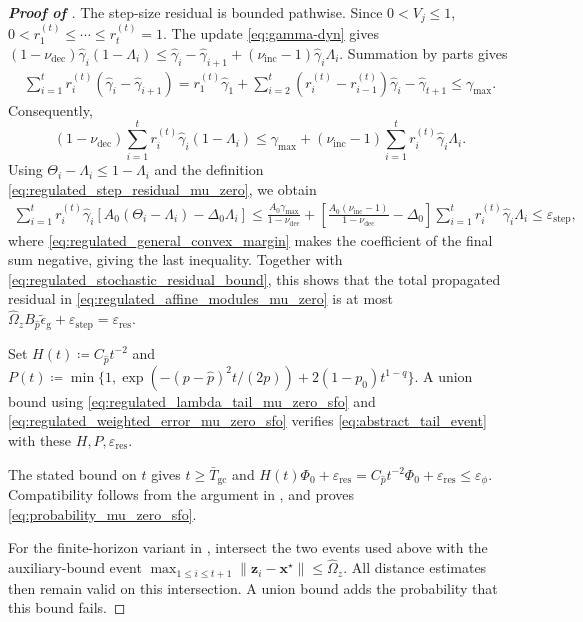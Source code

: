 \documentclass{article}
\begin{document}
\begin{proof}[\textbf{Proof of }]
The step-size residual is bounded pathwise.
Since \(0<V_j\le1\),
\(0<r_1^{(t)}\le\cdots\le r_t^{(t)}=1\).
The update \eqref{eq:gamma-dyn} gives
\( (1-\nu_{\mathrm{dec}})\hat\gamma_i(1-\Lambda_i)
\le\hat\gamma_i-\hat\gamma_{i+1}
+(\nu_{\mathrm{inc}}-1)\hat\gamma_i\Lambda_i\).
Summation by parts gives
\[
\begin{aligned}
\textstyle\sum_{i=1}^tr_i^{(t)}(\hat\gamma_i-\hat\gamma_{i+1})
=r_1^{(t)}\hat\gamma_1+
\sum_{i=2}^t(r_i^{(t)}-r_{i-1}^{(t)})\hat\gamma_i
-\hat\gamma_{t+1}\le\gamma_{\max}.
\end{aligned}
\]
Consequently,
\begin{equation}\label{eq:regulated_weighted_step_budget}
\textstyle(1-\nu_{\mathrm{dec}})\sum_{i=1}^tr_i^{(t)}\hat\gamma_i(1-\Lambda_i)
\le\gamma_{\max}
+(\nu_{\mathrm{inc}}-1)\sum_{i=1}^tr_i^{(t)}\hat\gamma_i\Lambda_i.
\end{equation}
Using \(\Theta_i-\Lambda_i\le1-\Lambda_i\) and the definition
\eqref{eq:regulated_step_residual_mu_zero}, we obtain
\[
\begin{aligned}
\textstyle\sum_{i=1}^tr_i^{(t)}\hat\gamma_i
[A_0(\Theta_i-\Lambda_i)-\Delta_0\Lambda_i]\le\frac{A_0\gamma_{\max}}{1-\nu_{\mathrm{dec}}}+
\left[\frac{A_0(\nu_{\mathrm{inc}}-1)}{1-\nu_{\mathrm{dec}}}-\Delta_0\right]
\sum_{i=1}^tr_i^{(t)}\hat\gamma_i\Lambda_i
\le\varepsilon_{\mathrm{step}},
\end{aligned}
\]
where \eqref{eq:regulated_general_convex_margin} makes the coefficient
of the final sum negative, giving the last inequality.
Together with \eqref{eq:regulated_stochastic_residual_bound}, this shows
that the total propagated residual in
\eqref{eq:regulated_affine_modules_mu_zero} is at most
\(\widehat\Omega_zB_{\hat p}\widetilde\epsilon_{\mathrm{g}}
+\varepsilon_{\mathrm{step}}=\varepsilon_{\mathrm{res}}\).

Set \(H(t)\coloneqq C_{\hat p}t^{-2}\) and
\(P(t)\coloneqq \min\{1,\exp(-(p-\hat p)^2t/(2p))
+2(1-p_0)t^{1-q}\}\).
A union bound using \eqref{eq:regulated_lambda_tail_mu_zero_sfo} and
\eqref{eq:regulated_weighted_error_mu_zero_sfo} verifies
\eqref{eq:abstract_tail_event} with these \(H,P,\varepsilon_{\mathrm{res}}\).

The stated bound on \(t\) gives \(t\ge\bar T_{\mathrm{gc}}\) and
\(H(t)\Phi_0+\varepsilon_{\mathrm{res}}
=C_{\hat p}t^{-2}\Phi_0+\varepsilon_{\mathrm{res}}
\le\varepsilon_\phi\). Compatibility follows
from the argument in , and 
proves \eqref{eq:probability_mu_zero_sfo}.

For the finite-horizon variant in
, intersect the two events used
above with the auxiliary-bound event
\(\max_{1\le i\le t+1}\|\bm{z}_i-\bm{x}^\star\|\le\widehat\Omega_z\).
All distance estimates then remain valid on this intersection.
A union bound adds the probability that this bound fails.
\end{proof}
\end{document}
